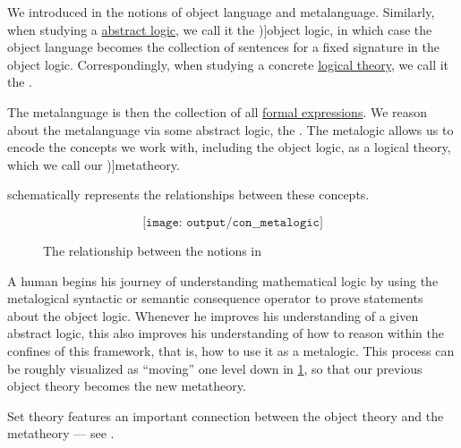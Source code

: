 \begin{concept}\label{con:metalogic}
  We introduced in  the notions of object language and metalanguage. Similarly, when studying a \hyperref[def:abstract_logic]{abstract logic}, we call it the \term[en=object logic (\cite[3]{Kleene2002Logic})]{object logic}, in which case the object language becomes the collection of sentences for a fixed signature in the object logic. Correspondingly, when studying a concrete \hyperref[def:logical_theory]{logical theory}, we call it the .

  The metalanguage is then the collection of all \hyperref[con:expressions]{formal expressions}. We reason about the metalanguage via some abstract logic, the . The metalogic allows us to encode the concepts we work with, including the object logic, as a logical theory, which we call our \term[en=metatheory (\cite[199]{Kleene2002Logic})]{metatheory}.

   schematically represents the relationships between these concepts.

  \begin{figure}[!ht]
    \begin{equation*}
      \texttt{[image: output/con\_\_metalogic]}
    \end{equation*}
    \caption{The relationship between the notions in }\label{fig:con:metalogic}
  \end{figure}

  A human begins his journey of understanding mathematical logic by using the metalogical syntactic or semantic consequence operator to prove statements about the object logic. Whenever he improves his understanding of a given abstract logic, this also improves his understanding of how to reason within the confines of this framework, that is, how to use it as a metalogic. This process can be roughly visualized as \enquote{moving} one level down in \cref{fig:con:metalogic}, so that our previous object theory becomes the new metatheory.
\end{concept}
\begin{comments}
  \item Set theory features an important connection between the object theory and the metatheory --- see .
\end{comments}

